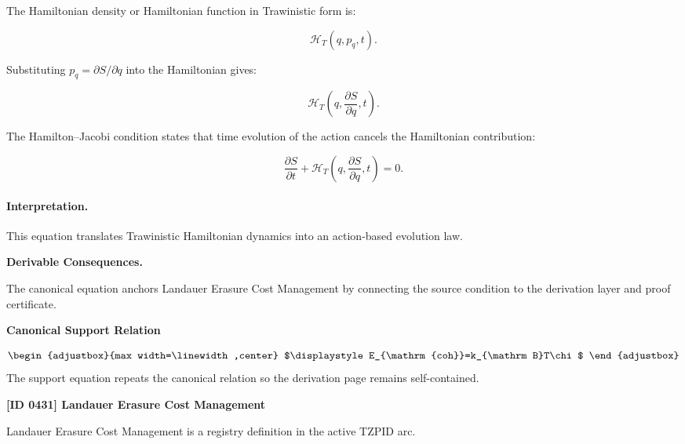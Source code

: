 The Hamiltonian density or Hamiltonian function in Trawinistic form is:

\begin{equation}
\mathcal{H}_T(q,p_q,t).
\end{equation}

Substituting $p_q=\partial S/\partial q$ into the Hamiltonian gives:

\begin{equation}
\mathcal{H}_T
\left(
q,\frac{\partial S}{\partial q},t
\right).
\end{equation}

The Hamilton--Jacobi condition states that time evolution of the action cancels the Hamiltonian contribution:

\begin{equation}
\boxed{
\frac{\partial S}{\partial t}
+
\mathcal{H}_T
\left(
q,\frac{\partial S}{\partial q},t
\right)
=
0 .
}
\end{equation}

\paragraph{Interpretation.}
This equation translates Trawinistic Hamiltonian dynamics into an action-based evolution law.

\par\vspace{0.35em}
\noindent\textbf{Derivable Consequences.}\quad
\begingroup
\footnotesize
\raggedright
The canonical equation anchors Landauer Erasure Cost Management by connecting the source condition to the derivation layer and proof certificate.
\par\endgroup

\noindent\textbf{Canonical Support Relation}\par
\[
\begin{adjustbox}{max width=\linewidth,center}
$\displaystyle
E_{\mathrm{coh}}=k_{\mathrm B}T\chi
$
\end{adjustbox}
\]
\noindent The support equation repeats the canonical relation so the derivation page remains self-contained.\par

\clearpage
\noindent\textbf{[ID 0431] Landauer Erasure Cost Management}\par
\vspace{0.35em}
\begingroup\small
{}
Landauer Erasure Cost Management is a registry definition in the active TZPID arc.

